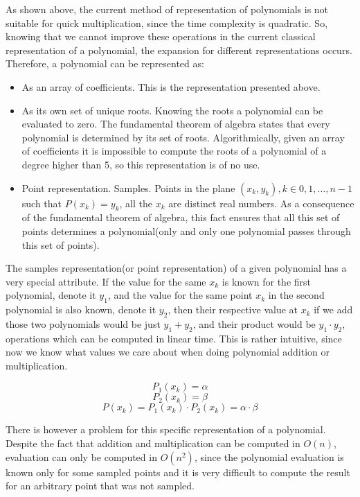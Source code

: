 \documentclass[letterpaper]{article}
\begin{document}
As shown above, the current method of representation of polynomials is not suitable for quick multiplication, since the time complexity is quadratic. So, knowing that we cannot improve these operations in the current classical representation of a polynomial, the expansion for different representations occurs. Therefore, a polynomial can be represented as:

\begin{itemize}
    \item As an array of coefficients. This is the representation presented above.
    \item As its own set of unique roots. Knowing the roots a polynomial can be evaluated to zero. The fundamental theorem of algebra states that every polynomial is determined by its set of roots. Algorithmically, given an array of coefficients it is impossible to compute the roots of a polynomial of a degree higher than 5, so this representation is of no use.
    \item Point representation. Samples. Points in the plane $(x_k, y_k), k \in {0,1,\dots,n-1}$ such that $P(x_{k}) = y_{k}$, all the $x_{k}$ are distinct real numbers. As a consequence of the fundamental theorem of algebra, this fact ensures that all this set of points determines a polynomial(only and only one polynomial passes through this set of points).
\end{itemize}

The samples representation(or point representation) of a given polynomial has a very special attribute. If the value for the same $x_{k}$ is known for the first polynomial, denote it $y_{1}$, and the value for the same point $x_{k}$ in the second polynomial is also known, denote it $y_{2}$, then their respective value at $x_{k}$ if we add those two polynomials would be just $y_{1} + y_{2}$, and their product would be $y_{1} \cdot y_{2}$, operations which can be computed in linear time. This is rather intuitive, since now we know what values we care about when doing polynomial addition or multiplication.

$$
P_{1}(x_{k}) = \alpha
$$
$$
P_{2}(x_{k}) = \beta
$$
$$
P(x_{k}) = P_{1}(x_{k}) \cdot P_{2}(x_{k}) = \alpha \cdot \beta 
$$

There is however a problem for this specific representation of a polynomial. Despite the fact that addition and multiplication can be computed in $O(n)$, evaluation can only be computed in $O(n^2)$, since the polynomial evaluation is known only for some sampled points and it is very difficult to compute the result for an arbitrary point that was not sampled.
\end{document}
